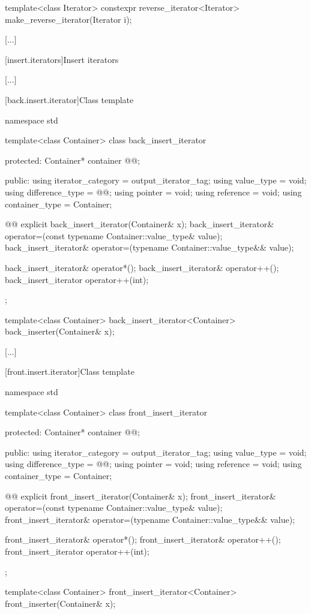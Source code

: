 %
%
\begin{itemdecl}
template<class Iterator>
  constexpr reverse_iterator<Iterator> make_reverse_iterator(Iterator i);
\end{itemdecl}

[...]

[insert.iterators]{Insert iterators}

[...]

[back.insert.iterator]{Class template }

%
\begin{codeblock}
namespace std {
  template<class Container>
  class back_insert_iterator {
  protected:
    Container* container @@;

  public:
    using iterator_category = output_iterator_tag;
    using value_type        = void;
    using difference_type   = @@;
    using pointer           = void;
    using reference         = void;
    using container_type    = Container;

    @@
    explicit back_insert_iterator(Container& x);
    back_insert_iterator& operator=(const typename Container::value_type& value);
    back_insert_iterator& operator=(typename Container::value_type&& value);

    back_insert_iterator& operator*();
    back_insert_iterator& operator++();
    back_insert_iterator  operator++(int);
  };

  template<class Container>
    back_insert_iterator<Container> back_inserter(Container& x);
}
\end{codeblock}

[...]

[front.insert.iterator]{Class template }

%
\begin{codeblock}
namespace std {
  template<class Container>
  class front_insert_iterator {
  protected:
    Container* container @@;

  public:
    using iterator_category = output_iterator_tag;
    using value_type        = void;
    using difference_type   = @@;
    using pointer           = void;
    using reference         = void;
    using container_type    = Container;

    @@
    explicit front_insert_iterator(Container& x);
    front_insert_iterator& operator=(const typename Container::value_type& value);
    front_insert_iterator& operator=(typename Container::value_type&& value);

    front_insert_iterator& operator*();
    front_insert_iterator& operator++();
    front_insert_iterator  operator++(int);
  };

  template<class Container>
    front_insert_iterator<Container> front_inserter(Container& x);
}
\end{codeblock}

